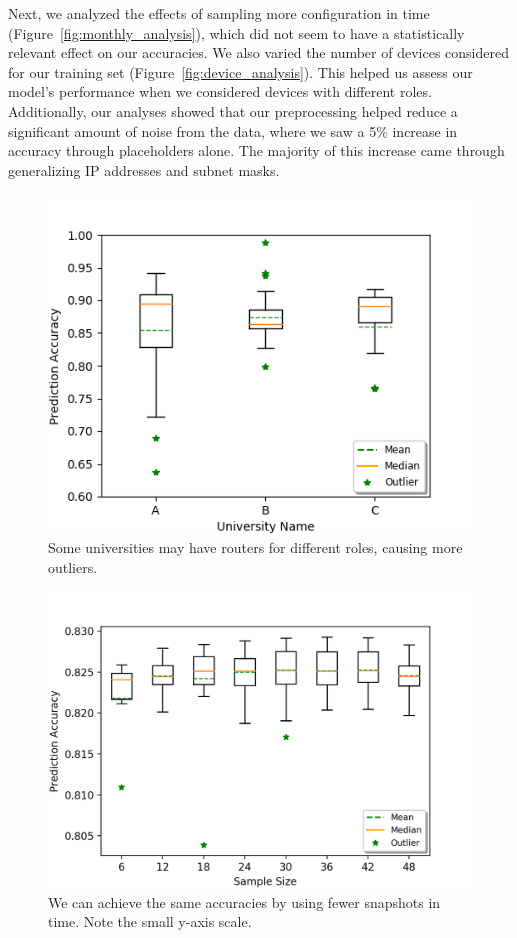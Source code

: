 Next, we analyzed the effects of sampling more configuration in time (Figure~\ref{fig:monthly_analysis}), which did not seem to have a statistically relevant effect on our accuracies. We also varied the number of devices considered for our training set (Figure~\ref{fig:device_analysis}). This helped us assess our model's performance when we considered devices with different roles. Additionally, our analyses showed that our preprocessing helped reduce a significant amount of noise from the data, where we saw a 5\% increase in accuracy through placeholders alone. The majority of this increase came through generalizing IP addresses and subnet masks.\\

\begin{figure}
	\centering
	\includegraphics[width=\columnwidth]{uni_analysis.png}
	\caption{Some universities may have routers for different roles, causing more outliers.}
    \label{fig:uni_analysis}
\end{figure}

\begin{figure}
	\centering
	\includegraphics[width=\columnwidth]{monthly_analysis.png}
	\caption{We can achieve the same accuracies by using fewer snapshots in time. Note the small y-axis scale.}
    \label{fig:umn_analysis}
\end{figure}

